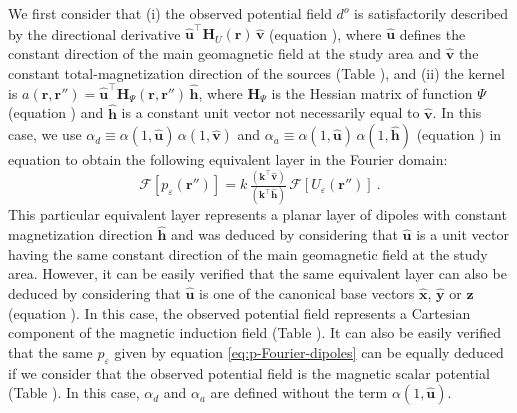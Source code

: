 We first consider that (i) the observed potential field $d^{o}$ 
is satisfactorily described by the directional derivative $\hat{\mathbf{u}}^{\top} \mathbf{H}_{U}(\mathbf{r}) \, \hat{\mathbf{v}}$ 
(equation ), where $\hat{\mathbf{u}}$ defines the constant direction of the main geomagnetic
field at the study area and $\hat{\mathbf{v}}$ the constant total-magnetization direction of the sources  (Table ), and (ii)
the kernel is $a(\mathbf{r}, \mathbf{r}'') = \hat{\mathbf{u}}^{\top} \mathbf{H}_{\Psi}(\mathbf{r}, \mathbf{r}'') \, \hat{\mathbf{h}}$,
where $\mathbf{H}_{\Psi}$ is the Hessian matrix \citep[e.g.,][ p. 158]{kaplan2002} of
function $\Psi$ (equation ) and $\hat{\mathbf{h}}$ is a constant unit vector not necessarily equal to 
$\hat{\mathbf{v}}$.
In this case, we use $\alpha_{d} \equiv \alpha(1, \hat{\mathbf{u}}) \, \alpha(1, \hat{\mathbf{v}})$ and 
$\alpha_{a} \equiv \alpha(1, \hat{\mathbf{u}}) \, \alpha(1, \hat{\mathbf{h}})$ 
(equation ) in equation  to obtain the following equivalent layer 
in the Fourier domain:
\begin{equation}
	\mathcal{F} [ p_{\varepsilon}(\mathbf{r}'') ] =
	k \, \tfrac{\left(\mathbf{k}^{\top} \hat{\mathbf{v}} \right)}{\left(\mathbf{k}^{\top} \hat{\mathbf{h}} \right)} \,
	\mathcal{F} \left[ U_{\varepsilon}(\mathbf{r}'') \right] \: .
	\label{eq:p-Fourier-dipoles}
\end{equation}
This particular equivalent layer represents a planar layer of dipoles with constant magnetization direction
$\hat{\mathbf{h}}$ and was deduced by considering
that $\hat{\mathbf{u}}$ is a unit vector having the same constant direction of the main geomagnetic field at the study area.
However, it can be easily verified that the same equivalent layer can also be deduced by considering that $\hat{\mathbf{u}}$ is one of the
canonical base vectors $\hat{\mathbf{x}}$, $\hat{\mathbf{y}}$ or $\hat{\mathbf{z}}$ (equation ).
In this case, the observed potential field represents a Cartesian component of the magnetic induction field  (Table ).
It can also be easily verified that the same $p_{\varepsilon}$ given by equation 
\ref{eq:p-Fourier-dipoles} can be equally deduced if we consider that the 
observed potential field is the magnetic scalar potential  (Table ). 
In this case, $\alpha_{d}$ and $\alpha_{a}$ are defined
without the term $\alpha(1, \hat{\mathbf{u}})$. 

